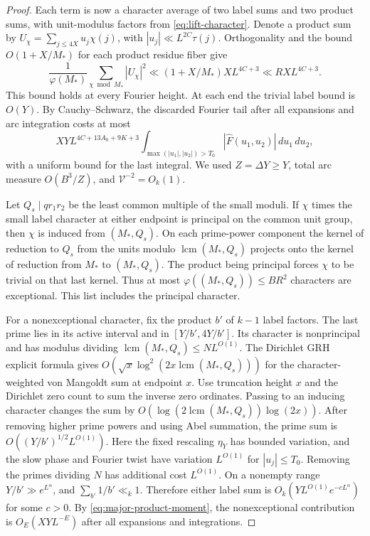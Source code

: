 \documentclass[11pt]{amsart}
\numberwithin{equation}{section}
\theoremstyle{remark}
\begin{document}
\begin{proof}
Each term is now a character average of two label sums and two
product sums, with unit-modulus factors from \eqref{eq:lift-character}.
Denote a product sum by $U_\chi=\sum_{j\leq4X}u_j\chi(j)$, with
$|u_j|\ll L^{2C}\tau(j)$. Orthogonality and the bound $O(1+X/M_*)$
for each product residue fiber give
\begin{equation}\label{eq:major-product-moment}
 \frac1{\varphi(M_*)}\sum_{\chi\bmod M_*}|U_\chi|^2
 \ll (1+X/M_*)XL^{4C+3}\ll RXL^{4C+3}.
\end{equation}
This bound holds at every Fourier height. At each end the trivial
label bound is $O(Y)$. By Cauchy--Schwarz, the discarded Fourier tail
after all expansions and arc integration costs at most
\[
 XYL^{4C+13A_0+9K+3}
    \int_{\max(|u_1|,|u_2|)>T_0}|\widehat F(u_1,u_2)|\,du_1\,du_2,
\]
with a uniform bound for the last integral. We used $Z=\Delta Y\geq Y$,
total arc measure $O(B^3/Z)$, and $\mathcal V^{-2}=O_k(1)$.

Let $Q_s\mid qr_1r_2$ be the least common multiple of the small moduli.
If $\chi$ times the small label character at either endpoint is
principal on the common unit group, then $\chi$ is induced from
$(M_*,Q_s)$. On each prime-power component the kernel of reduction to
$Q_s$ from the units modulo $\operatorname{lcm}(M_*,Q_s)$ projects
onto the kernel of reduction from $M_*$ to $(M_*,Q_s)$. The product
being principal forces $\chi$ to be trivial on that last kernel.
Thus at most $\varphi((M_*,Q_s))\leq BR^2$ characters are exceptional.
This list includes the principal character.

For a nonexceptional character, fix the product $b'$ of $k-1$ label
factors. The last prime lies in its active interval and in
$[Y/b',4Y/b']$. Its character is nonprincipal and has modulus dividing
$\operatorname{lcm}(M_*,Q_s)\leq NL^{O(1)}$. The Dirichlet GRH
explicit formula gives $O(\sqrt{x}\log^2(2x\operatorname{lcm}(M_*,Q_s)))$
for the character-weighted von Mangoldt sum at endpoint $x$. Use
truncation height $x$ and the Dirichlet zero count to sum the inverse
zero ordinates. Passing to an inducing character changes the sum by
$O(\log(2\operatorname{lcm}(M_*,Q_s))\log(2x))$.
\cite[Lemma~2]{KandhilLanguascoMoree}
After removing higher prime powers and using Abel summation, the
prime sum is $O((Y/b')^{1/2}L^{O(1)})$. Here the fixed rescaling
$\eta_Y$ has bounded variation, and the slow phase and Fourier twist
have variation $L^{O(1)}$ for $|u_j|\leq T_0$. Removing the primes
dividing $N$ has additional cost $L^{O(1)}$. On a nonempty range
$Y/b'\gg e^{L^\alpha}$, and $\sum_{b'}1/b'\ll_k1$. Therefore either
label sum is $O_k(YL^{O(1)}e^{-cL^\alpha})$ for some $c>0$.
By \eqref{eq:major-product-moment}, the nonexceptional contribution
is $O_E(XY L^{-E})$ after all expansions and integrations.


\end{proof}
\end{document}
